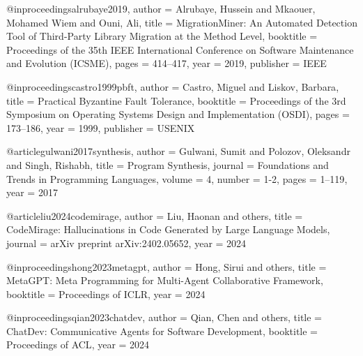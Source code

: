 @inproceedings{alrubaye2019,
  author    = {Alrubaye, Hussein and Mkaouer, Mohamed Wiem and Ouni, Ali},
  title     = {{MigrationMiner}: An Automated Detection Tool of Third-Party Library Migration at the Method Level},
  booktitle = {Proceedings of the 35th IEEE International Conference on Software Maintenance and Evolution (ICSME)},
  pages     = {414--417},
  year      = {2019},
  publisher = {IEEE}
}

@inproceedings{castro1999pbft,
  author    = {Castro, Miguel and Liskov, Barbara},
  title     = {Practical Byzantine Fault Tolerance},
  booktitle = {Proceedings of the 3rd Symposium on Operating Systems Design and Implementation (OSDI)},
  pages     = {173--186},
  year      = {1999},
  publisher = {USENIX}
}

@article{gulwani2017synthesis,
  author    = {Gulwani, Sumit and Polozov, Oleksandr and Singh, Rishabh},
  title     = {Program Synthesis},
  journal   = {Foundations and Trends in Programming Languages},
  volume    = {4},
  number    = {1-2},
  pages     = {1--119},
  year      = {2017}
}

@article{liu2024codemirage,
  author    = {Liu, Haonan and others},
  title     = {{CodeMirage}: Hallucinations in Code Generated by Large Language Models},
  journal   = {arXiv preprint arXiv:2402.05652},
  year      = {2024}
}

@inproceedings{hong2023metagpt,
  author    = {Hong, Sirui and others},
  title     = {{MetaGPT}: Meta Programming for Multi-Agent Collaborative Framework},
  booktitle = {Proceedings of ICLR},
  year      = {2024}
}

@inproceedings{qian2023chatdev,
  author    = {Qian, Chen and others},
  title     = {{ChatDev}: Communicative Agents for Software Development},
  booktitle = {Proceedings of ACL},
  year      = {2024}
}
